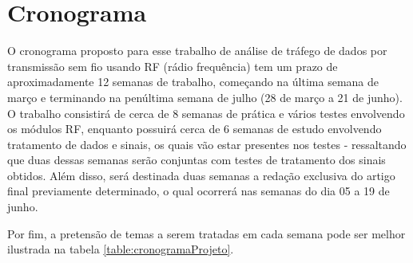 \documentclass[conference]{IEEEtran}
\begin{document}
\section{Cronograma}

O cronograma proposto para esse trabalho de an\'alise de tr\'afego de dados por transmiss\~ao sem fio usando RF (r\'adio frequ\^encia) tem um prazo de aproximadamente 12 semanas de trabalho, come\c{c}ando na \'ultima semana de mar\c{c}o e terminando na pen\'ultima semana de julho (28 de mar\c{c}o a 21 de junho). O trabalho consistir\'a de cerca de 8 semanas de pr\'atica e v\'arios testes envolvendo os m\'odulos RF, enquanto possuir\'a cerca de 6 semanas de estudo envolvendo tratamento de dados e sinais, os quais v\~ao estar presentes nos testes - ressaltando que duas dessas semanas ser\~ao conjuntas com testes de tratamento dos sinais obtidos. Al\'em disso, ser\'a destinada duas semanas a reda\c{c}\~ao exclusiva do artigo final previamente determinado, o qual ocorrer\'a nas semanas do dia 05 a 19 de junho.

Por fim, a pretens\~ao de temas a serem tratadas em cada semana pode ser melhor ilustrada na tabela \ref{table:cronogramaProjeto}.

%
\end{document}
